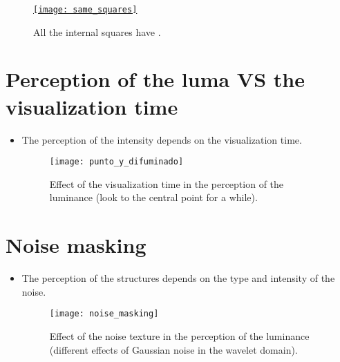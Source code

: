 \begin{figure}[H]
  \centering
  \href{https://github.com/vicente-gonzalez-ruiz/medical_imaging/blob/main/notebooks/same_squares.ipynb}{\texttt{[image: same\_squares]}}
  \caption[Lightness VS surrounding luminance (2).]{All the internal squares have .}
  \label{fig:squares}
\end{figure}

\section{Perception of the luma VS the visualization time}
\begin{itemize}
\item The perception of the intensity depends on the visualization time.
\begin{figure}[H]
  \vspace{-0ex}
  \centering
  \texttt{[image: punto\_y\_difuminado]}
  \caption[Effect of visualization time in the perception of the luminance.]{Effect of the visualization time in the perception of the luminance (look to the central point for a while).}
  \label{fig:luminance_vs_visualization_time}
\end{figure}
\end{itemize}

\section{Noise masking}
\begin{itemize}
\item The perception of the structures depends on the type and intensity of the noise.
\begin{figure}[H]
  \centering
  \texttt{[image: noise\_masking]}
  \caption[Noise masking effect.]{Effect of the noise texture in the perception of the luminance (different effects of Gaussian noise in the wavelet domain).}
  \label{fig:noise_masking}
\end{figure}
\end{itemize}
